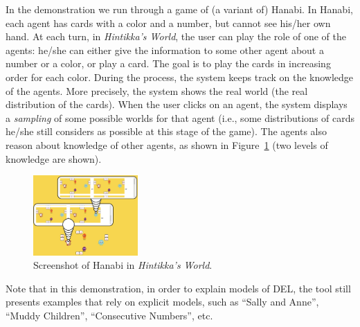 
In the demonstration we run through a game of (a variant of) Hanabi. 
In Hanabi, each agent has cards with a color and a
number, but cannot see his/her own hand.
At each turn, in \emph{Hintikka's World}, the user can play the role of one of the agents: he/she can either give the information to some other agent about a number or a color, or play a card. The goal is to play the cards in increasing order for each color.
During the process, the system keeps track on the knowledge of the agents.
More precisely, the system shows the real world (the real distribution of the cards). When the user clicks on an agent, the system displays a \emph{sampling} of some possible worlds for that agent (i.e., some distributions of cards he/she still considers as possible at this stage of the game). The agents also reason about knowledge of other agents, as shown in Figure~\ref{figure:guihanabi} (two levels of knowledge are shown).
%
%
%


\begin{figure}
	\begin{center}
		\includegraphics[width=4cm]{images/HW_screenshot_hanabi.png}
	\end{center}
\vspace{-3mm}
	\caption{Screenshot of Hanabi in \emph{Hintikka's World}.\label{figure:guihanabi}}
\end{figure}

Note that in this demonstration, in order to explain models of DEL, the tool still presents examples that rely on explicit models, such as ``Sally and Anne'', ``Muddy Children'', ``Consecutive Numbers'', etc.
